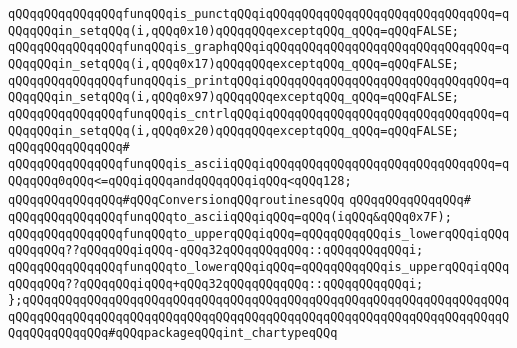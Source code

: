 \verb|qQQqqQQqqQQqqQQqfunqQQqis_punctqQQqiqQQqqQQqqQQqqQQqqQQqqQQqqQQqqQQq=qQQqqQQqin_setqQQq(i,qQQq0x10)qQQqqQQqexceptqQQq_qQQq=qQQqFALSE;|\newline
\verb|qQQqqQQqqQQqqQQqfunqQQqis_graphqQQqiqQQqqQQqqQQqqQQqqQQqqQQqqQQqqQQq=qQQqqQQqin_setqQQq(i,qQQq0x17)qQQqqQQqexceptqQQq_qQQq=qQQqFALSE;|\newline
\verb|qQQqqQQqqQQqqQQqfunqQQqis_printqQQqiqQQqqQQqqQQqqQQqqQQqqQQqqQQqqQQq=qQQqqQQqin_setqQQq(i,qQQq0x97)qQQqqQQqexceptqQQq_qQQq=qQQqFALSE;|\newline
\verb|qQQqqQQqqQQqqQQqfunqQQqis_cntrlqQQqiqQQqqQQqqQQqqQQqqQQqqQQqqQQqqQQq=qQQqqQQqin_setqQQq(i,qQQq0x20)qQQqqQQqexceptqQQq_qQQq=qQQqFALSE;|\newline
\verb|qQQqqQQqqQQqqQQq#|\newline
\verb|qQQqqQQqqQQqqQQqfunqQQqis_asciiqQQqiqQQqqQQqqQQqqQQqqQQqqQQqqQQqqQQq=qQQqqQQq0qQQq<=qQQqiqQQqandqQQqqQQqiqQQq<qQQq128;|\newline
\newline
\verb|qQQqqQQqqQQqqQQq#qQQqConversionqQQqroutinesqQQq|\newline
\verb|qQQqqQQqqQQqqQQq#|\newline
\verb|qQQqqQQqqQQqqQQqfunqQQqto_asciiqQQqiqQQq=qQQq(iqQQq&qQQq0x7F);|\newline
\verb|qQQqqQQqqQQqqQQqfunqQQqto_upperqQQqiqQQq=qQQqqQQqqQQqis_lowerqQQqiqQQqqQQqqQQq??qQQqqQQqiqQQq-qQQq32qQQqqQQqqQQq::qQQqqQQqqQQqi;|\newline
\verb|qQQqqQQqqQQqqQQqfunqQQqto_lowerqQQqiqQQq=qQQqqQQqqQQqis_upperqQQqiqQQqqQQqqQQq??qQQqqQQqiqQQq+qQQq32qQQqqQQqqQQq::qQQqqQQqqQQqi;|\newline
\newline
\newline
\newline
\verb|};qQQqqQQqqQQqqQQqqQQqqQQqqQQqqQQqqQQqqQQqqQQqqQQqqQQqqQQqqQQqqQQqqQQqqQQqqQQqqQQqqQQqqQQqqQQqqQQqqQQqqQQqqQQqqQQqqQQqqQQqqQQqqQQqqQQqqQQqqQQqqQQqqQQqqQQq#qQQqpackageqQQqint_chartypeqQQq|\newline
\newline
\newline

